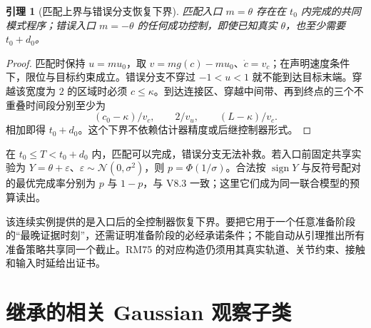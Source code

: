 \documentclass[11pt,a4paper,fontset=fandol]{ctexart}
\newtheorem{lemma}[theorem]{引理}
\theoremstyle{definition}
\theoremstyle{remark}
\numberwithin{equation}{section}
\begin{document}
\begin{lemma}[匹配上界与错误分支恢复下界]
\label{lem:physical}
匹配入口 $m=\theta$ 存在在 $t_0$ 内完成的共同模式程序；错误入口 $m=-\theta$ 的任何成功控制，即使已知真实 $\theta$，也至少需要 $t_0+d_0$。
\end{lemma}
\begin{proof}
匹配时保持 $u=mu_0$，取 $v=mg(c)-mu_0$、$\dot c=v_c$；在声明速度条件下，限位与目标约束成立。错误分支不穿过 $-1<u<1$ 就不能到达目标末端。穿越该宽度为 $2$ 的区域时必须 $c\le\kappa$。到达连接区、穿越中间带、再到终点的三个不重叠时间段分别至少为
\[
 (c_0-\kappa)/v_c,\qquad 2/v_u,\qquad (L-\kappa)/v_c.
\]
相加即得 $t_0+d_0$。这个下界不依赖估计器精度或后继控制器形式。
\end{proof}

在 $t_0\le T<t_0+d_0$ 内，匹配可以完成，错误分支无法补救。若入口前固定共享实验为 $Y=\theta+\varepsilon$、$\varepsilon\sim\mathcal N(0,\sigma^2)$，则 $p=\Phi(1/\sigma)$。合法按 $\operatorname{sign}Y$ 与反符号配对的最优完成率分别为 $p$ 与 $1-p$，与 V8.3 一致；这里它们成为同一联合模型的预算读出。

该连续实例提供的是入口后的全控制器恢复下界。要把它用于一个任意准备阶段的“最晚证据时刻”，还需证明准备阶段的必经承诺条件；不能自动从引理推出所有准备策略共享同一个截止。RM75 的对应构造仍须用其真实轨道、关节约束、接触和输入时延给出证书。

\section{继承的相关 Gaussian 观察子类}
\end{document}
